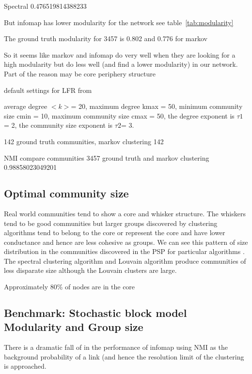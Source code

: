 Spectral 
0.476519814388233


But infomap has lower modularity for the network see table~\ref{tab:modularity}


The ground truth modularity for 3457 is 0.802 and 0.776 for markov

So it seems like markov and infomap do very well when they are looking for a high modularity but do less well (and find a lower modularity) in our network. Part of the reason may be core periphery structure


default settings for LFR from  \cite{lancichinetti2012consensus}

average degree $<k>$= 20, maximum degree kmax = 50, minimum community size cmin = 10, maximum community size cmax = 50, the degree exponent is $\tau1$ = 2, the community size exponent is $\tau2$= 3. 

142 ground truth communities, markov clustering 142

NMI compare communities 3457 ground truth and markov clustering 0.98858023049201

\subsection{Optimal community size}
Real world communities tend to show a core and whisker structure. The whiskers tend to be good communities but larger groups discovered by clustering algorithms tend to belong to the core or represent the core and have lower conductance and hence are less cohesive as groups. We can see this pattern of size distribution in the communities discovered in the PSP for particular algorithms . The spectral clustering algorithm and Louvain algorithm produce communities of less disparate size although the Louvain clusters are large. 

Approximately 80\% of nodes are in the core 

\cite{leskovec2010empirical}

\subsection{Benchmark: Stochastic block model Modularity and Group size}
\label{sec:benchmark sbm}
There is a dramatic fall of in the performance of infomap using NMI as the background probability of a link (and hence the resolution limit of the clustering is approached.

